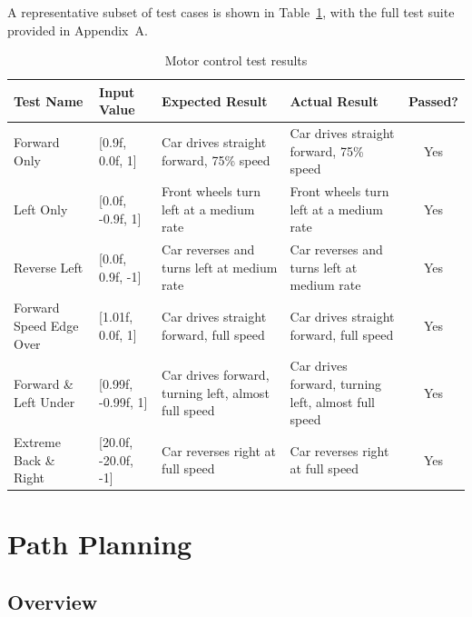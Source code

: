 A representative subset of test cases is shown in Table~\ref{tab:motor_tests}, with the full test suite provided in Appendix~A.

\begin{table}[h]
\centering
\begin{tabular}{|l|l|p{4cm}|p{4cm}|c|}
\hline
\textbf{Test Name} & \textbf{Input Value} & \textbf{Expected Result} & \textbf{Actual Result} & \textbf{Passed?} \\
\hline

Forward Only & [0.9f, 0.0f, 1] & Car drives straight forward, 75\% speed & Car drives straight forward, 75\% speed & Yes \\
\hline

Left Only & [0.0f, -0.9f, 1] & Front wheels turn left at a medium rate & Front wheels turn left at a medium rate & Yes \\
\hline

Reverse Left & [0.0f, 0.9f, -1] & Car reverses and turns left at medium rate & Car reverses and turns left at medium rate & Yes \\
\hline

Forward Speed Edge Over & [1.01f, 0.0f, 1] & Car drives straight forward, full speed & Car drives straight forward, full speed & Yes \\
\hline

Forward \& Left Under & [0.99f, -0.99f, 1] & Car drives forward, turning left, almost full speed & Car drives forward, turning left, almost full speed & Yes \\
\hline

Extreme Back \& Right & [20.0f, -20.0f, -1] & Car reverses right at full speed & Car reverses right at full speed & Yes \\
\hline

\end{tabular}
\caption{Motor control test results}
\label{tab:motor_tests}
\end{table}

\section{Path Planning}

\subsection{Overview}



